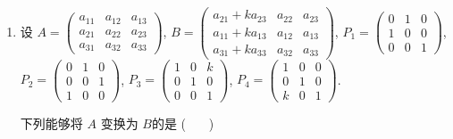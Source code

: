 \begin{enumerate}
	\item 设 $A = \begin{pmatrix} a_{11} & a_{12} & a_{13} \\ a_{21} & a_{22} & a_{23} \\ a_{31} & a_{32} & a_{33} \end{pmatrix}$, $B = \begin{pmatrix} a_{21}+ka_{23} & a_{22} & a_{23} \\ a_{11}+ka_{13} & a_{12} & a_{13} \\ a_{31}+ka_{33} & a_{32} & a_{33} \end{pmatrix}$, $P_1 = \begin{pmatrix} 0 & 1 & 0 \\ 1 & 0 & 0 \\ 0 & 0 & 1 \end{pmatrix}$, $P_2 = \begin{pmatrix} 0 & 1 & 0 \\ 0 & 0 & 1 \\ 1 & 0 & 0 \end{pmatrix}$, $P_3 = \begin{pmatrix} 1 & 0 & k \\ 0 & 1 & 0 \\ 0 & 0 & 1 \end{pmatrix}$, $P_4 = \begin{pmatrix} 1 & 0 & 0 \\ 0 & 1 & 0 \\ k & 0 & 1 \end{pmatrix}$.
	
	下列能够将 $A$ 变换为 $B$的是 ( \ \ \ )
	\vspace{0.5em}
	

\end{enumerate}
